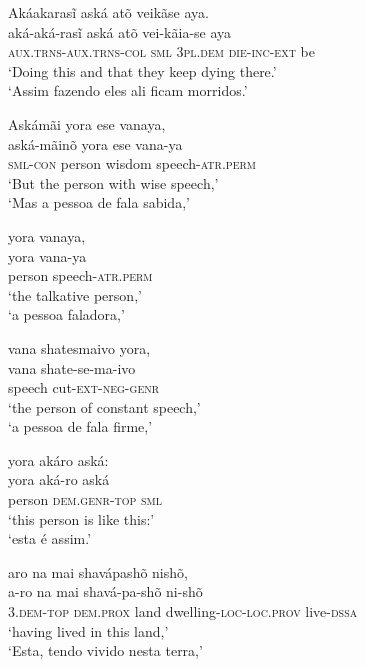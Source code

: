 \documentclass[output=paper,
modfonts,nonflat
]{langsci/langscibook}
\begin{document}
\ea Akáakarasĩ aská atõ veikãse aya. \\[.3em]
\gll aká-aká-rasĩ                   aská         atõ              vei-kãia-se          aya \\
     \textsc{aux.trns-aux.trns-col} \textsc{sml} 3\textsc{pl.dem} \textsc{die-inc-ext} be  \\
\glt `Doing this and that they keep dying there.' \\
`Assim fazendo eles ali ficam morridos.' \\
\z

\ea Askámãi yora ese vanaya, \\[.3em]
\gll aská-mãinõ       yora   ese    vana-ya                  \\
     \textsc{sml-con} person wisdom speech-\textsc{atr.perm} \\
\glt `But the person with wise speech,' \\
`Mas a pessoa de fala sabida,' \\
\z

\ea yora vanaya, \\[.3em]
\gll yora   vana-ya                  \\
     person speech-\textsc{atr.perm} \\
\glt `the talkative person,' \\
`a pessoa faladora,' \\
\z

\ea vana shatesmaivo yora, \\[.3em]
\gll vana   shate-se-ma-ivo           \\
     speech cut-\textsc{ext-neg-genr} \\
\glt `the person of constant speech,' \\
`a pessoa de fala firme,' \\
\z

\newpage 
\ea yora akáro aská: \\[.3em]
\gll yora   aká-ro                aská         \\
     person \textsc{dem.genr-top} \textsc{sml} \\
\glt `this person is like this:' \\
`esta é assim.' \\
\z

\ea aro na mai shavápashõ nishõ, \\[.3em]
\gll a-ro na        mai  shavá-pa-shõ                   ni-shõ             \\
     3.\textsc{dem-top} \textsc{dem.prox} land dwelling-\textsc{loc-loc.prov} live-\textsc{dssa} \\
\glt `having lived in this land,' \\
`Esta, tendo vivido nesta terra,' \\
\z
\end{document}
